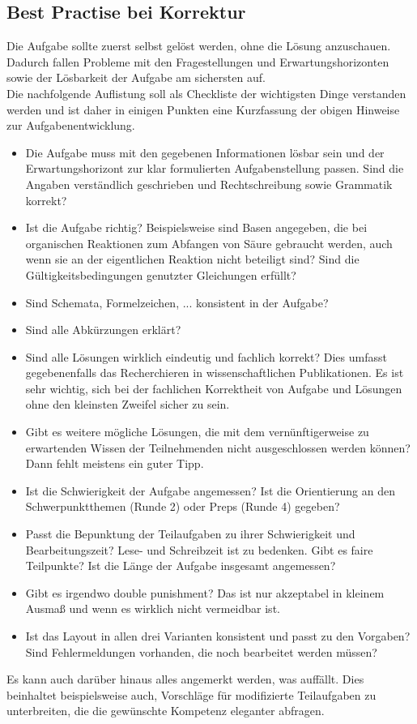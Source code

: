 \documentclass[../main.tex]{subfiles}
\begin{document}
\newpage
\subsection{Best Practise bei Korrektur}
Die Aufgabe sollte zuerst selbst gelöst werden, ohne die Lösung anzuschauen. Dadurch fallen Probleme mit den Fragestellungen und Erwartungshorizonten sowie der Lösbarkeit der Aufgabe am sichersten auf. \\ Die nachfolgende Auflistung soll als Checkliste der wichtigsten Dinge verstanden werden und ist daher in einigen Punkten eine Kurzfassung der obigen Hinweise zur Aufgabenentwicklung. 
\begin{itemize}
    \item Die Aufgabe muss mit den gegebenen Informationen lösbar sein und der Erwartungshorizont zur klar formulierten Aufgabenstellung passen. Sind die Angaben verständlich geschrieben und Rechtschreibung sowie Grammatik korrekt?
    \item Ist die Aufgabe richtig? Beispielsweise sind Basen angegeben, die bei organischen Reaktionen zum Abfangen von Säure gebraucht werden, auch wenn sie an der eigentlichen Reaktion nicht beteiligt sind? Sind die Gültigkeitsbedingungen genutzter Gleichungen erfüllt?
    \item Sind Schemata, Formelzeichen, ... konsistent in der Aufgabe?
    \item Sind alle Abkürzungen erklärt?
    \item Sind alle Lösungen wirklich eindeutig und fachlich korrekt? Dies umfasst gegebenenfalls das Recherchieren in wissenschaftlichen Publikationen. Es ist sehr wichtig, sich bei der fachlichen Korrektheit von Aufgabe und Lösungen ohne den kleinsten Zweifel sicher zu sein. 
    \item Gibt es weitere mögliche Lösungen, die mit dem vernünftigerweise zu erwartenden Wissen der Teilnehmenden nicht ausgeschlossen werden können? Dann fehlt meistens ein guter Tipp.
    \item Ist die Schwierigkeit der Aufgabe angemessen? Ist die Orientierung an den Schwerpunktthemen (Runde 2) oder Preps (Runde 4) gegeben?
    \item Passt die Bepunktung der Teilaufgaben zu ihrer Schwierigkeit und Bearbeitungszeit? Lese- und Schreibzeit ist zu bedenken. Gibt es faire Teilpunkte? Ist die Länge der Aufgabe insgesamt angemessen?
    \item Gibt es irgendwo double punishment? Das ist nur akzeptabel in kleinem Ausmaß und wenn es wirklich nicht vermeidbar ist.
    \item Ist das Layout in allen drei Varianten konsistent und passt zu den Vorgaben? Sind Fehlermeldungen vorhanden, die noch bearbeitet werden müssen? 
\end{itemize}
Es kann auch darüber hinaus alles angemerkt werden, was auffällt. Dies beinhaltet beispielsweise auch, Vorschläge für modifizierte Teilaufgaben zu unterbreiten, die die gewünschte Kompetenz eleganter abfragen. 
\end{document}
